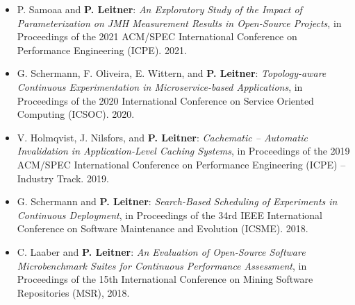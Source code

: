 \documentclass[paper=letter,fontsize=11pt]{scrartcl} %
\begin{document}
\begin{itemize}
  \item P. Samoaa and \textbf{P. Leitner}: \emph{An Exploratory Study of the Impact of Parameterization on JMH Measurement Results in Open-Source Projects}, in Proceedings of the 2021 ACM/SPEC  International Conference on Performance Engineering (ICPE). 2021.  
\item G. Schermann, F. Oliveira, E. Wittern, and \textbf{P. Leitner}: \emph{Topology-aware Continuous Experimentation in Microservice-based Applications}, in Proceedings of the 2020 International Conference on Service Oriented Computing (ICSOC). 2020.
	\item V. Holmqvist, J. Nilsfors, and \textbf{P. Leitner}: \emph{Cachematic -- Automatic Invalidation in Application-Level Caching Systems}, in Proceedings of the 2019 ACM/SPEC  International Conference on Performance Engineering (ICPE) -- Industry Track. 2019.
	\item G. Schermann and \textbf{P. Leitner}: \emph{Search-Based Scheduling of Experiments in Continuous Deployment}, in Proceedings of the 34rd IEEE International Conference on Software Maintenance and Evolution (ICSME). 2018.
	\item C. Laaber and \textbf{P. Leitner}: \emph{An Evaluation of Open-Source Software Microbenchmark Suites for Continuous Performance Assessment}, in Proceedings of the 15th International Conference on Mining Software Repositories (MSR), 2018.

\end{itemize}
\end{document}
